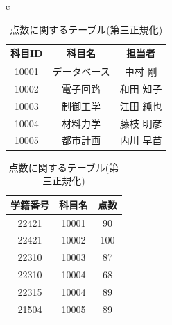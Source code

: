 \documentclass[a4j]{jarticle}
\begin{document}
            \begin{table}[H]
              \begin{center}
                \begin{tabular}{c}

              \begin{minipage}{0.5\hsize}
              \caption{科目に関するテーブル(第三正規化)}
              \label{subject3}
              \begin{center}
                \begin{tabular}{c|c|c}\hline
                  科目ID & 科目名 & 担当者 \\ \hline \hline
                  10001 & データベース & 中村 剛 \\ \hline 
                  10002 & 電子回路 & 和田 知子 \\ \hline
                  10003 & 制御工学 & 江田 純也 \\ \hline
                  10004 & 材料力学 & 藤枝 明彦 \\ \hline
                  10005 & 都市計画 & 内川 早苗 \\ \hline
                 \end{tabular}
              \end{center}
            \end{minipage}

            \begin{minipage}{0.5\hsize}
                \caption{点数に関するテーブル(第三正規化)}
                \label{score3}
                \begin{center}
                  \begin{tabular}{c|c|c}\hline
                    学籍番号 & 科目名 & 点数 \\ \hline \hline
                    22421 & 10001 & 90 \\ \hline
                    22421 & 10002 & 100 \\ \hline
                    22310 & 10003 & 87 \\ \hline
                    22310 & 10004 & 68 \\ \hline
                    22315 & 10004 & 89 \\ \hline
                    21504 & 10005 & 89 \\ \hline
                   \end{tabular}
                \end{center}
              \end{minipage}
            \end{tabular}
          \end{center}
                \end{table}
\end{document}
